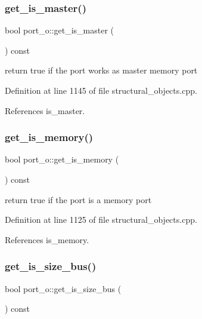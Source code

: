 \subsubsection{\texorpdfstring{get\+\_\+is\+\_\+master()}{get\_is\_master()}}
{\footnotesize\ttfamily bool port\+\_\+o\+::get\+\_\+is\+\_\+master (\begin{DoxyParamCaption}{ }\end{DoxyParamCaption}) const}



return true if the port works as master memory port 



Definition at line 1145 of file structural\+\_\+objects.\+cpp.



References is\+\_\+master.

\mbox{\label{structport__o_a2565771d94bfc442b11c18a22cbaf43d}} 
\subsubsection{\texorpdfstring{get\+\_\+is\+\_\+memory()}{get\_is\_memory()}}
{\footnotesize\ttfamily bool port\+\_\+o\+::get\+\_\+is\+\_\+memory (\begin{DoxyParamCaption}{ }\end{DoxyParamCaption}) const}



return true if the port is a memory port 



Definition at line 1125 of file structural\+\_\+objects.\+cpp.



References is\+\_\+memory.

\mbox{\label{structport__o_ae1a8168623582541d977dda80d73461c}} 
\subsubsection{\texorpdfstring{get\+\_\+is\+\_\+size\+\_\+bus()}{get\_is\_size\_bus()}}
{\footnotesize\ttfamily bool port\+\_\+o\+::get\+\_\+is\+\_\+size\+\_\+bus (\begin{DoxyParamCaption}{ }\end{DoxyParamCaption}) const}



